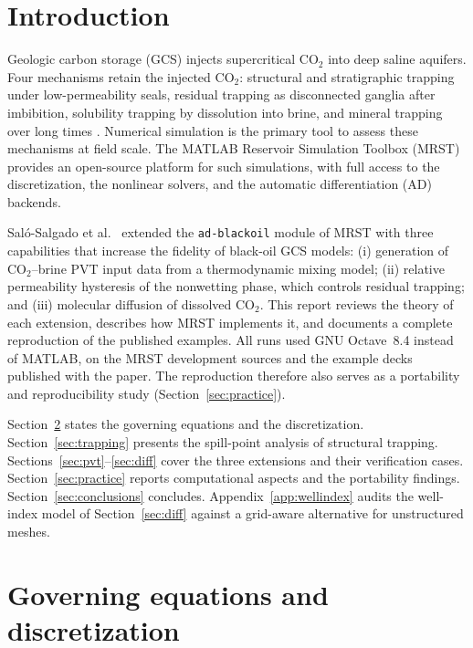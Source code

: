 \documentclass[preprint,11pt]{elsarticle}
\begin{document}
\section{Introduction}
\label{sec:intro}

Geologic carbon storage (GCS) injects supercritical CO$_2$ into deep
saline aquifers. Four mechanisms retain the injected CO$_2$: structural
and stratigraphic trapping under low-permeability seals, residual
trapping as disconnected ganglia after imbibition, solubility trapping by
dissolution into brine, and mineral trapping over long times
\cite{benson2005}. Numerical simulation is the primary tool to assess
these mechanisms at field scale. The MATLAB Reservoir Simulation Toolbox
(MRST) \cite{lie2019,lie-moyner2021} provides an open-source platform for
such simulations, with full access to the discretization, the nonlinear
solvers, and the automatic differentiation (AD) backends.

Sal\'o-Salgado et al.~\cite{salo2024} extended the \texttt{ad-blackoil}
module of MRST with three capabilities that increase the fidelity of
black-oil GCS models: (i) generation of CO$_2$--brine PVT input data from
a thermodynamic mixing model; (ii) relative permeability hysteresis of
the nonwetting phase, which controls residual trapping; and (iii)
molecular diffusion of dissolved CO$_2$. This report reviews the theory
of each extension, describes how MRST implements it, and documents a
complete reproduction of the published examples. All runs used GNU
Octave~8.4 instead of MATLAB, on the MRST development sources and the
example decks published with the paper. The reproduction therefore also
serves as a portability and reproducibility study
(Section~\ref{sec:practice}).

Section~\ref{sec:model} states the governing equations and the
discretization. Section~\ref{sec:trapping} presents the spill-point
analysis of structural trapping. Sections~\ref{sec:pvt}--\ref{sec:diff}
cover the three extensions and their verification cases.
Section~\ref{sec:practice} reports computational aspects and the
portability findings. Section~\ref{sec:conclusions} concludes.
Appendix~\ref{app:wellindex} audits the well-index model of
Section~\ref{sec:diff} against a grid-aware alternative for unstructured
meshes.

\section{Governing equations and discretization}
\label{sec:model}
\end{document}
